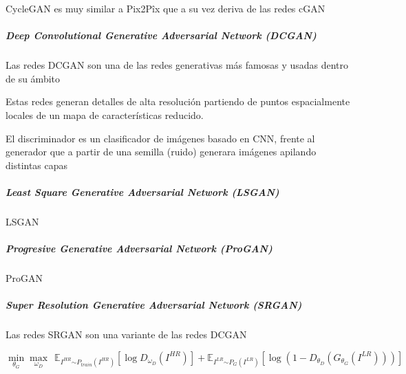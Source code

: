 \gls{CycleGAN} es muy similar a \gls{Pix2Pîx} \cite{pix2pix-isola2018imagetoimage} que a su vez deriva de las redes \gls{cGAN}


\subparagraph*{Deep Convolutional Generative Adversarial Network (DCGAN)}
Las redes \gls{DCGAN} \cite{DCGAN-radford2016unsupervised,DCGAN-viola2020faultface,DCGAN-aslan2019deep,DCGAN-curto2020highresolution} son una de las redes generativas más famosas y usadas dentro de su ámbito

Estas redes generan detalles de alta resolución partiendo de puntos espacialmente locales de un mapa de características reducido.

El discriminador es un clasificador de imágenes basado en \gls{CNN}, frente al generador que a partir de una semilla (ruido) generara imágenes apilando distintas capas



\subparagraph*{Least Square Generative Adversarial Network (LSGAN)}
\gls{LSGAN} \cite{LSGAN-mao2017squares}

\subparagraph*{Progresive Generative Adversarial Network (ProGAN)}

\gls{ProGAN} \cite{ProGAN-karras2018progressive}



\subparagraph*{Super Resolution Generative Adversarial Network (SRGAN)}
Las redes \gls{SRGAN} \cite{SRGAN-ledig2017photorealistic} son una variante de las redes \gls{DCGAN}

\begin{equation}
    \min_{\theta_{G}} \max_{\omega_{D}} ~~ \mathbb{E}_{I^{H R} {\sim P_{train} (I^{H R})}} \left[ \log D_{\omega_{D}}(I^{H R}) \right] + \mathbb{E}_{I^{L R} {\sim P_{G} (I^{L R})}} \left[ \log( 1 - D_{\theta_{D}}(G_{\theta_{G}}(I^{L R}))) \right]
\end{equation}


